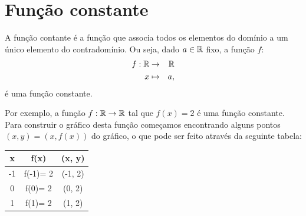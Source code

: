 

\section{Função constante}

A função contante é a função que associa todos os elementos do domínio a um único elemento do contradomínio. Ou seja, dado $a \in \mathbb{R}$ fixo, a função $f$:
\begin{eqnarray*}
 f: \mathbb{R} & \rightarrow & \mathbb{R} \\
 x & \mapsto & a,
\end{eqnarray*}
é uma função constante.

Por exemplo, a função $f:\mathbb{R}\to\mathbb{R}$ tal que $f(x)=2$ é uma função constante. Para construir o gráfico desta função começamos encontrando alguns pontos $(x, y)= (x, f(x))$ do gráfico, o que pode ser feito através da seguinte tabela:

 \begin{table}[H]
 \centering
 \begin{tabular}{|c|c|c|} \hline
 \rowcolor{gray}
  x & f(x) & (x, y)  \\\hline
  -1 & f(-1)= 2 & (-1, 2) \\\hline
   0 & f(0)= 2 & (0, 2)  \\\hline
   1 & f(1)= 2 & (1, 2) \\\hline
 \end{tabular}
\end{table}

